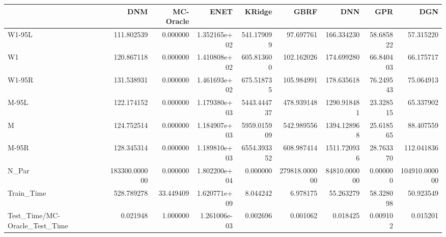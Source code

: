 \begin{tabular}{lrrrrrrrr}
\toprule
{} &            DNM &  MC-Oracle &          ENET &       KRidge &           GBRF &           DNN &        GPR &            DGN \\
\midrule
W1-95L                        &     111.802539 &   0.000000 &  1.352165e+02 &   541.179099 &      97.697761 &    166.334230 &  58.685822 &      57.315220 \\
W1                            &     120.867118 &   0.000000 &  1.410808e+02 &   605.813600 &     102.162026 &    174.699280 &  66.840403 &      66.175717 \\
W1-95R                        &     131.538931 &   0.000000 &  1.461693e+02 &   675.518735 &     105.984991 &    178.635618 &  76.249543 &      75.064913 \\
M-95L                         &     122.174152 &   0.000000 &  1.179380e+03 &  5443.444737 &     478.939148 &   1290.918481 &  23.328515 &      65.337902 \\
M                             &     124.752514 &   0.000000 &  1.184907e+03 &  5959.015909 &     542.989556 &   1394.128968 &  25.618565 &      88.407559 \\
M-95R                         &     128.345314 &   0.000000 &  1.189810e+03 &  6554.393352 &     608.987414 &   1511.720936 &  28.763370 &     112.041836 \\
N\_Par                         &  183300.000000 &   0.000000 &  1.802200e+04 &     0.000000 &  279818.000000 &  84810.000000 &   0.000000 &  104910.000000 \\
Train\_Time                    &     528.789278 &  33.449409 &  1.620771e+09 &     8.044242 &       6.978175 &     55.263279 &  58.328098 &      50.923549 \\
Test\_Time/MC-Oracle\_Test\_Time &       0.021948 &   1.000000 &  1.261006e-03 &     0.002696 &       0.001062 &      0.018425 &   0.009102 &       0.015201 \\
\bottomrule
\end{tabular}
